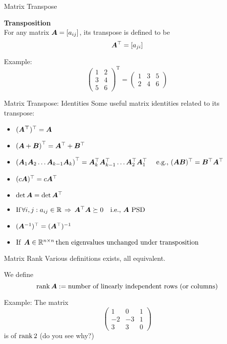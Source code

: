 \begin{frame}{Matrix Transpose}
    \begin{boxed}
        \textbf{Transposition}\\
        For any matrix $\bm{A} = [a_{ij}]$, its transpose is defined to be
        $$\bm{A}^\top  = [a_{ji}]$$
    \end{boxed}

    Example:
    $$
        \begin{pmatrix}
            1 & 2 \\
            3 & 4 \\
            5 & 6
        \end{pmatrix}^{\operatorname{T}}
        =
        \begin{pmatrix}
            1 & 3 & 5 \\
            2 & 4 & 6
        \end{pmatrix}
    $$
\end{frame}

\begin{frame}{Matrix Transpose: Identities}
    Some useful matrix identities related to its transpose:
    \begin{boxed}
        \begin{itemize}
            \item $(\bm{A^\top})^\top = \bm{A}$
            \item $\left(\bm{A} + \bm{B}\right)^\top = \bm{A}^\top + \bm{B}^\top$
            \item $\left(\bm{A}_1 \bm{A}_2 \ldots \bm{A}_{k-1} \bm{A}_k\right)^\top = \bm{A}_k^\top \bm{A}_{k-1}^\top \ldots \bm{A}_2^\top \bm{A}_1^\top \quad \text{ e.g., }(\bm{AB})^\top = \bm{B}^\top\bm{A}^\top$
            \item $(c\bm{A})^\top = c \bm{A}^\top$
            \item $\det \bm{A} = \det \bm{A}^\top$
            \item $\text{If}\, \forall i,j: a_{ij} \in \mathbb{R}\, \Rightarrow \,\bm{A}^\top \bm{A} \succeq 0 \quad \text{i.e., $\bm{A}$ PSD}$
            \item $(\bm{A}^{-1})^\top = (\bm{A}^\top)^{-1}$
            \item $\text{If }\,\bm{A} \in \mathbb{R}^{n\times n}\,\text{then eigenvalues unchanged under transposition}$
        \end{itemize}
    \end{boxed}
\end{frame}

\begin{frame}{Matrix Rank}
    Various definitions exists, all equivalent.
    \begin{boxed}
        We define
        $$\rank \bm{A} := \text{number of linearly independent rows (or columns)}$$
    \end{boxed}

    Example: The matrix
    $$\begin{pmatrix}1&0&1\\-2&-3&1\\3&3&0\end{pmatrix}$$
    is of $\rank 2$ (do you see why?)
\end{frame}

